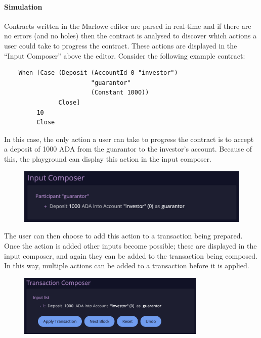\documentclass[runningheads]{llncs}
\begin{document}
\paragraph{Simulation}

Contracts written in the Marlowe editor are parsed in real-time and if there are no errors (and no holes) then the contract is analysed to discover which actions a user could take to progress the contract. These actions are displayed in the ``Input Composer'' above the editor. Consider the following example contract:
\begin{verbatim}
    When [Case (Deposit (AccountId 0 "investor")
                        "guarantor"
                        (Constant 1000))
               Close]
         10
         Close
\end{verbatim}
In this case, the only action a user can take to progress the contract is to accept a deposit of 1000 ADA
from the guarantor to the investor's account. Because of this, the playground can display this action in the input composer.

\begin{figure}[]
    \includegraphics[width=1\textwidth]{input_composer.png}
\end{figure}

\noindent
The user can then choose to add this action to a transaction being prepared. Once the action is added other inputs become possible; these are displayed in the input composer, and again they can be added to the transaction being composed. In this way, multiple actions can be added to a transaction before it is applied.

\begin{figure}[]
    \includegraphics[width=0.8\textwidth]{tx_composer.png}
\end{figure}
\end{document}
